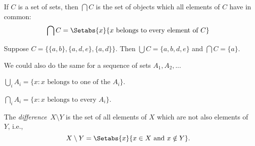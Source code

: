 \documentclass[open-logic-section]{subfiles}
\begin{document}
\begin{defn}
If $C$ is a set of sets, then $\bigcap C$ is the set of objects which
all elements of $C$ have in common:
\[
\bigcap C = \Setabs{x}{x \text{ belongs to every element of } C}
\]
\end{defn}

\begin{ex}
Suppose $C = \{ \{ a, b \}, \{ a, d, e \}, \{ a, d \} \}$.
Then $\bigcup C = \{ a, b, d, e \}$ and $\bigcap C = \{ a \}$.
\end{ex}

We could also do the same for a sequence of sets $A_1, A_2, ... $

$\bigcup_i A_i = \{ x : x \mbox{ belongs to one of the } A_i \}$.

$\bigcap_i A_i = \{ x : x \mbox{ belongs to every } A_i \}$.

\begin{defn}
The \emph{difference}~$X \setminus Y$ is the set of all elements of
$X$ which are not also elements of $Y$, i.e.,
\[
X\setminus Y = \Setabs{x}{x\in X \text{ and } x \notin Y}.
\]
\end{defn}
\end{document}
